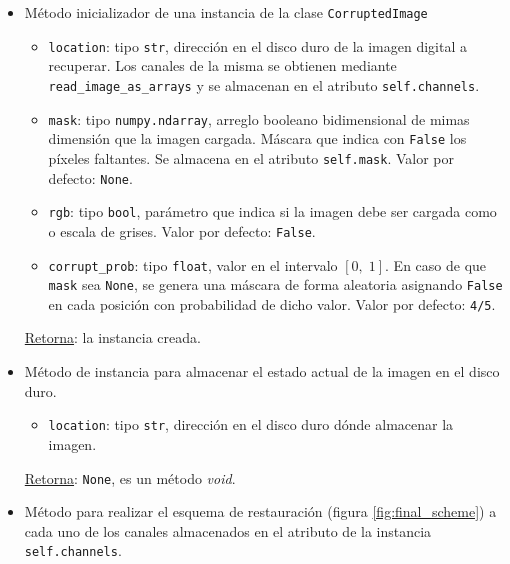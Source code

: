 \begin{itemize}
	\item M\'etodo inicializador de una instancia de la clase \texttt{CorruptedImage}
	
	\begin{itemize}
		\item \texttt{location}: tipo \texttt{str}, direcci\'on en el disco duro de la imagen digital a recuperar. Los canales de la misma se obtienen mediante \texttt{read\_image\_as\_arrays} y se almacenan en el atributo \texttt{self.channels}.
		\item \texttt{mask}: tipo \texttt{numpy.ndarray}, arreglo booleano bidimensional de mimas dimensi\'on que la imagen cargada. M\'ascara que indica con \texttt{False} los p\'ixeles faltantes. Se almacena en el atributo \texttt{self.mask}. Valor por defecto: \texttt{None}.
		\item \texttt{rgb}: tipo \texttt{bool}, par\'ametro que indica si la imagen debe ser cargada como \RGB o escala de grises. Valor por defecto: \texttt{False}.
		\item \texttt{corrupt\_prob}: tipo \texttt{float}, valor en el intervalo $[0,\; 1]$. En caso de que \texttt{mask} sea \texttt{None}, se genera una m\'ascara de forma aleatoria asignando \texttt{False} en cada posici\'on con probabilidad de dicho valor. Valor por defecto: \texttt{4/5}. 
	\end{itemize}
	\underline{Retorna}: la instancia creada.
	
	\item M\'etodo de instancia para almacenar el estado actual de la imagen en el disco duro.
	
	\begin{itemize}
		\item \texttt{location}: tipo \texttt{str}, direcci\'on en el disco duro d\'onde almacenar la imagen. 
	\end{itemize}
	\underline{Retorna}: \texttt{None}, es un m\'etodo \textit{void}.
	
	\item M\'etodo para realizar el esquema de restauraci\'on (figura \ref{fig:final_scheme}) a cada uno de los canales almacenados en el atributo de la instancia \texttt{self.channels}.
	

\end{itemize}
